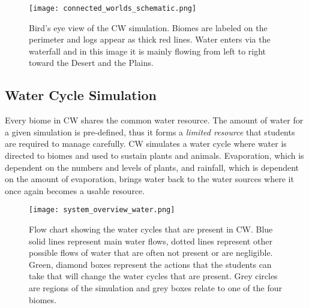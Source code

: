 \begin{figure}
\centering
\texttt{[image: connected\_worlds\_schematic.png]}
\caption{Bird's eye view of the CW simulation. Biomes are labeled on the perimeter and logs appear as thick red lines. Water enters via the waterfall and in this image it is mainly flowing from left to right toward the Desert and the Plains.}
\label{fig:connected_worlds_graphic}
\end{figure}




\subsection{Water Cycle Simulation}
Every biome in CW shares the common water resource. The amount of water for a given simulation is pre-defined, thus it forms a \textit{limited resource} that students are required to manage carefully. CW simulates a water cycle where water is directed to biomes and used to sustain plants and animals. Evaporation, which is dependent on the numbers and levels of plants, and rainfall, which is dependent on the amount of evaporation, brings water back to the water sources where it once again becomes a usable resource.

\begin{figure}
\centering
\texttt{[image: system\_overview\_water.png]}
\caption{Flow chart showing the water cycles that are present in CW. Blue solid lines represent main water flows, dotted lines represent other possible flows of water that are often not present or are negligible. Green, diamond boxes represent the actions that the students can take that will change the water cycles that are present. Grey circles are regions of the simulation and grey boxes relate to one of the four biomes.}
\label{fig:system_overview_water}
\end{figure}

